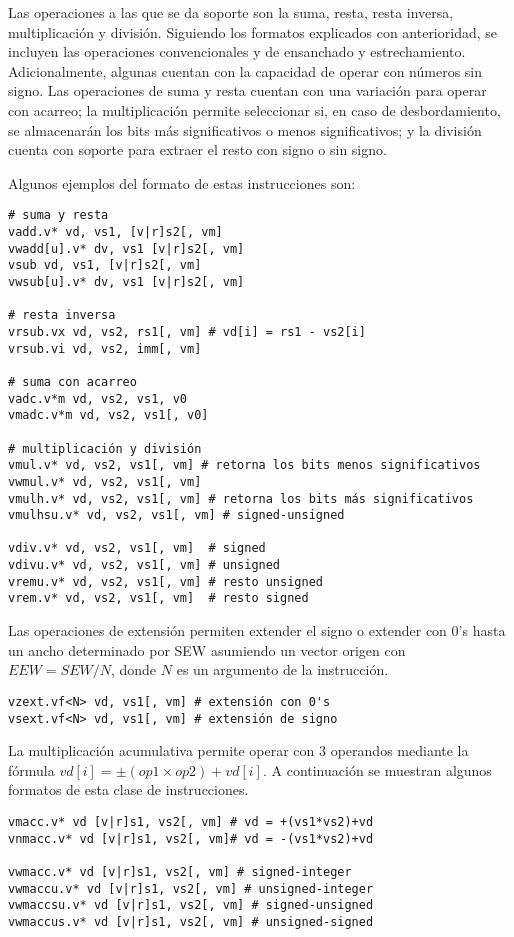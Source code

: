 Las operaciones a las que se da soporte son la suma, resta, resta inversa,
multiplicación y división. Siguiendo los formatos explicados con anterioridad,
se incluyen las operaciones convencionales y de ensanchado y estrechamiento.
Adicionalmente, algunas cuentan con la capacidad de operar con números sin
signo. Las operaciones de suma y resta cuentan con una variación para operar
con acarreo; la multiplicación permite seleccionar si, en caso de
desbordamiento, se almacenarán los bits más significativos o menos
significativos; y la división cuenta con soporte para extraer el resto con
signo o sin signo.

Algunos ejemplos del formato de estas instrucciones son:

\begin{lstlisting}
# suma y resta
vadd.v* vd, vs1, [v|r]s2[, vm]
vwadd[u].v* dv, vs1 [v|r]s2[, vm]
vsub vd, vs1, [v|r]s2[, vm]
vwsub[u].v* dv, vs1 [v|r]s2[, vm]

# resta inversa
vrsub.vx vd, vs2, rs1[, vm] # vd[i] = rs1 - vs2[i]
vrsub.vi vd, vs2, imm[, vm]

# suma con acarreo
vadc.v*m vd, vs2, vs1, v0
vmadc.v*m vd, vs2, vs1[, v0]

# multiplicación y división
vmul.v* vd, vs2, vs1[, vm] # retorna los bits menos significativos
vwmul.v* vd, vs2, vs1[, vm]
vmulh.v* vd, vs2, vs1[, vm] # retorna los bits más significativos
vmulhsu.v* vd, vs2, vs1[, vm] # signed-unsigned

vdiv.v* vd, vs2, vs1[, vm]  # signed
vdivu.v* vd, vs2, vs1[, vm] # unsigned
vremu.v* vd, vs2, vs1[, vm] # resto unsigned
vrem.v* vd, vs2, vs1[, vm]  # resto signed

\end{lstlisting}

Las operaciones de extensión permiten extender el signo o extender con 0's
hasta un ancho determinado por SEW asumiendo un vector origen con $EEW =
SEW/N$, donde $N$ es un argumento de la instrucción.

\begin{lstlisting}
vzext.vf<N> vd, vs1[, vm] # extensión con 0's
vsext.vf<N> vd, vs1[, vm] # extensión de signo
\end{lstlisting}

La multiplicación acumulativa permite operar con 3 operandos mediante la
fórmula $vd[i] = \pm(op1 \times op2) + vd[i]$. A continuación se muestran
algunos formatos de esta clase de instrucciones.

\begin{lstlisting}
vmacc.v* vd [v|r]s1, vs2[, vm] # vd = +(vs1*vs2)+vd
vnmacc.v* vd [v|r]s1, vs2[, vm]# vd = -(vs1*vs2)+vd

vwmacc.v* vd [v|r]s1, vs2[, vm] # signed-integer
vwmaccu.v* vd [v|r]s1, vs2[, vm] # unsigned-integer
vwmaccsu.v* vd [v|r]s1, vs2[, vm] # signed-unsigned
vwmaccus.v* vd [v|r]s1, vs2[, vm] # unsigned-signed
\end{lstlisting}

